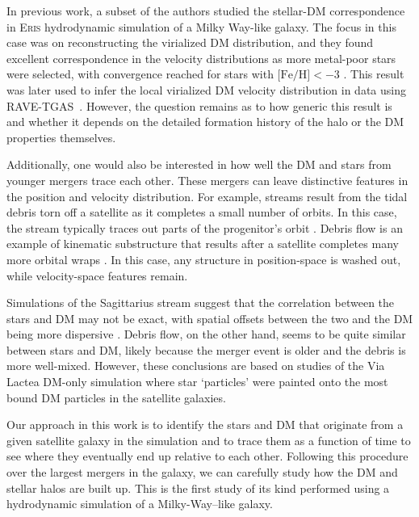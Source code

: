 \documentclass[twocolumn,preprintnumbers]{aastex6}
\newcommand{\FeH}{\text{[Fe/H]} }
\begin{document}
In previous work, a subset of the authors studied the stellar-DM correspondence in \textsc{Eris} hydrodynamic simulation of a Milky Way-like galaxy.  The focus in this case was on reconstructing the virialized DM distribution, and they found excellent correspondence in the velocity distributions as more metal-poor stars were selected, with convergence reached for stars with $\FeH < -3$ \citep{Herzog-Arbeitman:2017fte}.  This result was later used to infer the local virialized DM velocity distribution in data using RAVE-TGAS~\citep{Herzog-Arbeitman:2017zbm}. However, the question remains as to how generic this result is and whether it depends on the detailed formation history of the halo or the DM properties themselves. 

Additionally, one would also be interested in how well the DM and stars from younger mergers trace each other.  These mergers can leave distinctive features in the position and velocity distribution.  For example, streams result from the tidal debris torn off a satellite as it completes a small number of orbits.  In this case, the stream typically traces out parts of the progenitor's orbit \citep{2012JCAP...08..027P}.  Debris flow is an example of kinematic substructure that results after a satellite completes many more  orbital wraps \citep{Lisanti:2011as,Kuhlen:2012fz}.  In this case, any structure in position-space is washed out, while velocity-space features remain.  

Simulations of the Sagittarius stream suggest that the correlation between the stars and DM may not be exact, with spatial offsets between the two and the DM being more dispersive \citep{2012JCAP...08..027P}.  Debris flow, on the other hand, seems to be quite similar between stars and DM, likely because the merger event is older and the debris is more well-mixed.  However, these conclusions are based on studies of the Via Lactea DM-only simulation where star `particles' were painted onto the most bound DM particles in the satellite galaxies.

Our approach in this work is to identify the stars and DM that originate from a given satellite galaxy in the simulation and to trace them as a function of time to see where they eventually end up relative to each other.  Following this procedure over the largest mergers in the galaxy, we can carefully study how the DM  and stellar halos are built up.  This is the first study of its kind performed using a hydrodynamic simulation of a Milky-Way--like galaxy.  
\end{document}
